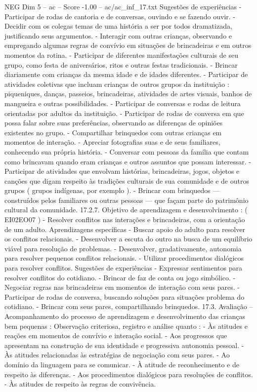 \begin{textsample}{NEG Dim 5 – ac – Score -1.00 – ac/ac\_inf\_17.txt}
Sugestões de experiências - Participar de rodas de cantoria e de conversas, ouvindo e se fazendo ouvir. - Decidir com os colegas temas de uma história a ser por todos dramatizada, justificando seus argumentos. - Interagir com outras crianças, observando e empregando algumas regras de convívio em situações de brincadeiras e em outros momentos da rotina. - Participar de diferentes manifestações culturais de seu grupo, como festa de aniversários, ritos e outras festas tradicionais. - Brincar diariamente com crianças da mesma idade e de idades diferentes. - Participar de atividades coletivas que incluam crianças de outros grupos da instituição : piqueniques, danças, passeios, brincadeiras, atividades de artes visuais, banhos de mangueira e outras possibilidades. - Participar de conversas e rodas de leitura orientadas por adultos da instituição. - Participar de rodas de conversa em que possa falar sobre suas preferências, observando as diferenças de opiniões existentes no grupo. - Compartilhar brinquedos com outras crianças em momentos de interação. - Apreciar fotografias suas e de seus familiares, conhecendo sua própria história. - Conversar com pessoas da família que contam como brincavam quando eram crianças e outros assuntos que possam interessar. - Participar de atividades que envolvam histórias, brincadeiras, jogos, objetos e canções que digam respeito às tradições culturais de sua comunidade e de outros grupos ( grupos indígenas, por exemplo ). - Brincar com brinquedos — construídos pelos familiares ou outras pessoas — que façam parte do patrimônio cultural da comunidade. 17.2.7.
Objetivo de aprendizagem e desenvolvimento : ( EI02EO07 ) - Resolver conflitos nas interações e brincadeiras, com a orientação de um adulto.
Aprendizagens específicas - Buscar apoio do adulto para resolver os conflitos relacionais. - Desenvolver a escuta do outro na busca de um equilíbrio viável para resolução de problemas. - Desenvolver, gradativamente, autonomia para resolver pequenos conflitos relacionais. - Utilizar procedimentos dialógicos para resolver conflitos.
Sugestões de experiências - Expressar sentimentos para resolver conflitos do cotidiano. - Brincar de faz de conta ou jogo simbólico. - Negociar regras nas brincadeiras em momentos de interação com seus pares. - Participar de rodas de conversa, buscando soluções para situações problema do cotidiano. - Brincar com seus pares, compartilhando brinquedos. 17.3.
Avaliação – Acompanhamento do processo de aprendizagem e desenvolvimento das crianças bem pequenas : Observação criteriosa, registro e análise quanto : - Às atitudes e reações em momentos de convívio e interação social. - Aos progressos que apresentam na construção de sua identidade e progressiva autonomia pessoal. - Às atitudes relacionadas às estratégias de negociação com seus pares. - Ao domínio da linguagem para se comunicar. - À atitude de reconhecimento e de respeito às diferenças. - Aos procedimentos dialógicos para resoluções de conflitos. - Às atitudes de respeito às regras de convivência.

\end{textsample}

